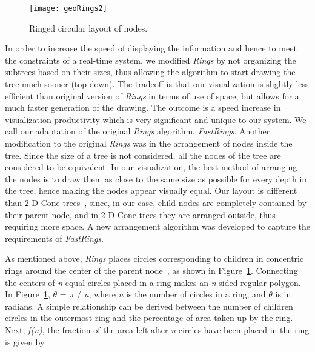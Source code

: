 \documentclass[10pt,psfig]{article}
\begin{document}
{\begin{figure}[t]
\centering
\texttt{[image: geoRings2]}
\caption{Ringed circular layout of nodes.}
\label{fig_geoRings}
\end{figure}

In order to increase the speed of displaying the information and hence to meet the constraints of a real-time system, 
we modified {\em Rings} by not organizing the subtrees based on their sizes, thus allowing the algorithm to start drawing the tree much sooner (top-down).
The tradeoff is that our visualization is slightly less efficient than original version of {\em Rings} in terms of use of space, but allows for a much faster generation of the drawing.
The outcome is a speed increase in visualization productivity which is very significant and unique to our system.
We call our adaptation of the original {\em Rings} algorithm, {\em FastRings}.
Another modification to the original {\em Rings} was in the arrangement of nodes inside the tree.  
Since the size of a tree is not considered, all the nodes of the tree are considered to be equivalent.
In our visualization, the best method of arranging the nodes is to draw them as close to the same size as possible for every depth in the tree, hence making the nodes appear visually equal.
Our layout is different than 2-D Cone trees~\cite{rms91},  since, in our case, child nodes are completely contained by their parent node, and in 2-D Cone trees they are arranged outside, thus requiring more space.
A new arrangement algorithm was developed to capture the requirements of {\em FastRings}.

As mentioned above, {\em Rings} places circles corresponding to children in concentric rings around the center of the parent node~\cite{tm02}, as shown in Figure~\ref{fig_geoRings}.
Connecting the centers of {\em n} equal circles placed in a ring makes an {\em n}-sided regular polygon.
In Figure~\ref{fig_geoRings}, $\theta$ = $\pi$ / {\em n}, where {\em n} is the number of circles in a ring, and $\theta$ is in radians.
A simple relationship can be derived between the number of children circles in the outermost ring and the percentage of area taken up by the ring.
Next, {\em f(n)}, the fraction of the area left after {\em n} circles have been placed in the ring is given by~\cite{tm02}:

}
\end{document}
